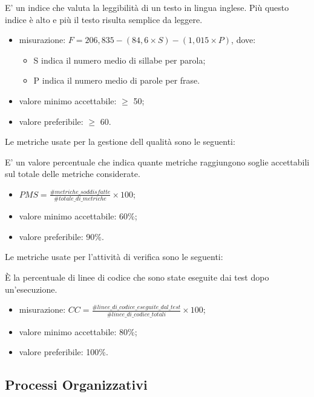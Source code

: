 		E' un indice che valuta la leggibilità di un testo in lingua inglese. Più questo indice è alto e più il testo risulta semplice da leggere.
		 \begin{itemize}
			\item{misurazione: $ F = 206,835 - (84,6 \times S) - (1,015 \times P) $, dove: 
				\begin{itemize}
					\item S indica il numero medio di sillabe per parola; 
					\item P indica il numero medio di parole per frase. 
				\end{itemize}}
			\item{valore minimo accettabile: $\geq$ 50;}
			\item{valore preferibile: $\geq$ 60.}
		\end{itemize}

	Le metriche usate per la gestione dell qualità sono le seguenti:
	
		E' un valore percentuale che indica quante metriche raggiungono soglie accettabili sul totale delle metriche considerate.
		\begin{itemize}
			\item{$PMS=\displaystyle\frac{\#metriche\_soddisfatte}{\#totale\_di\_metriche} \times 100$;}
			\item{valore minimo accettabile: 60\%;}
			\item{valore preferibile: 90\%.}
		\end{itemize}
					
	Le metriche usate per l'attività di verifica sono le seguenti:
	
		 È la percentuale di linee di codice che sono state eseguite dai test dopo un’esecuzione.
		 \begin{itemize}
			\item{misurazione: $ CC = \displaystyle\frac{\#linee\_di\_codice\_eseguite\_dal\_test}{\#linee\_di\_codice\_totali} \times 100$;}
			\item{valore minimo accettabile: 80\%;}
			\item{valore preferibile: 100\%.}
		\end{itemize}

\subsection{Processi Organizzativi}

